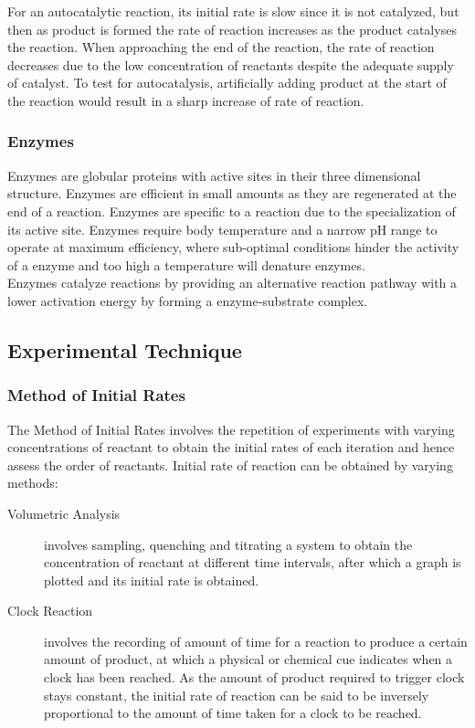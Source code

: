 \documentclass[../main]{subfiles}
\begin{document}
	For an autocatalytic reaction, its initial rate is slow since it is not catalyzed, but then as product is formed the rate of reaction increases as the product catalyses the reaction. When approaching the end of the reaction, the rate of reaction decreases due to the low concentration of reactants despite the adequate supply of catalyst. To test for autocatalysis, artificially adding product at the start of the reaction would result in a sharp increase of rate of reaction.

	\subsubsection{Enzymes}


	Enzymes are globular proteins with active sites in their three dimensional structure. Enzymes are efficient in small amounts as they are regenerated at the end of a reaction. Enzymes are specific to a reaction due to the specialization of its active site. Enzymes require body temperature and a narrow pH range to operate at maximum efficiency, where sub-optimal conditions hinder the activity of a enzyme and too high a temperature will denature enzymes. \\

	Enzymes catalyze reactions by providing an alternative reaction pathway with a lower activation energy by forming a enzyme-substrate complex.

	\subsection{Experimental Technique}

	\subsubsection{Method of Initial Rates}

	The Method of Initial Rates involves the repetition of experiments with varying concentrations of reactant to obtain the initial rates of each iteration and hence assess the order of reactants. Initial rate of reaction can be obtained by varying methods:

	\begin{description}
		\item[Volumetric Analysis] involves sampling, quenching and titrating a system to obtain the concentration of reactant at different time intervals, after which a graph is plotted and its initial rate is obtained.
		\item[Clock Reaction] involves the recording of amount of time for a reaction to produce a certain amount of product, at which a physical or chemical cue indicates when a clock has been reached. As the amount of product required to trigger clock stays constant, the initial rate of reaction can be said to be inversely proportional to the amount of time taken for a clock to be reached.
	\end{description}
\end{document}
